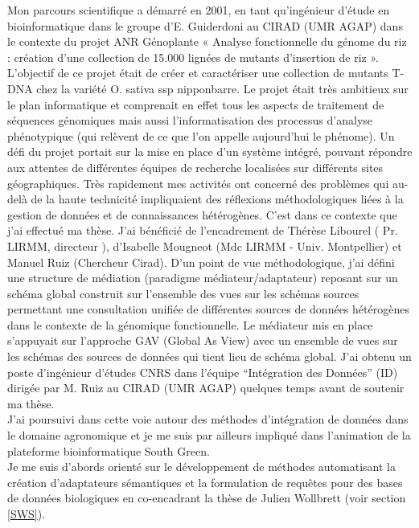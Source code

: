 Mon parcours scientifique a démarré en 2001, en tant qu’ingénieur d’étude en bioinformatique dans le groupe d’E. Guiderdoni au CIRAD (UMR AGAP) dans le contexte du projet ANR Génoplante « Analyse fonctionnelle du génome du riz : création d'une collection de 15.000 lignées de mutants d'insertion de riz ».  L'objectif de ce projet était de créer et caractériser une collection de mutants T-DNA chez la variété O. sativa ssp nipponbarre. Le projet était très ambitieux sur le plan informatique et comprenait en effet tous les aspects de traitement de séquences génomiques mais aussi l’informatisation des processus d’analyse phénotypique (qui relèvent de ce que l’on appelle aujourd’hui le phénome). Un défi du projet portait sur la mise en place d’un système intégré, pouvant répondre aux attentes de différentes  équipes de recherche localisées sur différents sites géographiques. Très rapidement mes activités ont concerné des problèmes qui au-delà de la haute technicité impliquaient des réflexions méthodologiques liées à la gestion de données et de connaissances hétérogènes. C’est dans ce contexte que j’ai effectué ma thèse. J’ai bénéficié de l’encadrement  de Thérèse Libourel ( Pr. LIRMM, directeur ), d’Isabelle Mougneot (Mdc LIRMM - Univ. Montpellier) et Manuel Ruiz (Chercheur Cirad). D’un point de vue méthodologique, j’ai défini une structure de médiation (paradigme médiateur/adaptateur) reposant sur un schéma global construit sur l'ensemble des vues sur les schémas sources permettant une consultation unifiée de différentes sources de données hétérogènes dans le contexte de la génomique fonctionnelle. Le médiateur mis en place s’appuyait sur l’approche GAV (Global As View) avec un ensemble de vues sur les schémas des sources de données qui tient lieu de schéma global. J’ai obtenu un poste d’ingénieur d’études CNRS dans l’équipe “Intégration des Données” (ID) dirigée par M. Ruiz au CIRAD (UMR AGAP) quelques temps avant de soutenir ma thèse. \\

J’ai poursuivi dans cette voie autour des méthodes d’intégration de données dans le domaine agronomique et je me suis par ailleurs impliqué dans l’animation de la plateforme bioinformatique South Green.  \\
Je me suis d’abords orienté sur le développement de méthodes automatisant la création d’adaptateurs sémantiques et la formulation de requêtes pour des bases de données biologiques en co-encadrant la thèse de Julien Wollbrett (voir section \ref{SWS}).\\

